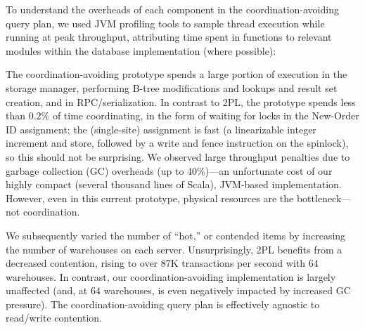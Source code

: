  To understand the overheads
of each component in the coordination-avoiding query plan, we used JVM
profiling tools to sample thread execution while running at peak
throughput, attributing time spent in functions to relevant modules
within the database implementation (where possible):

\begin{center}
\centering
\small
\setlength{\fboxsep}{4pt}
\end{center}

The coordination-avoiding prototype spends a large portion of
execution in the storage manager, performing B-tree modifications and
lookups and result set creation, and in RPC/serialization. In contrast
to 2PL, the prototype spends less than $0.2\%$ of time coordinating,
in the form of waiting for locks in the New-Order ID assignment; the
(single-site) assignment is fast (a linearizable integer increment and
store, followed by a write and fence instruction on the spinlock), so
this should not be surprising. We observed large throughput penalties
due to garbage collection (GC) overheads (up to 40\%)---an unfortunate
cost of our highly compact (several thousand lines of Scala),
JVM-based implementation. However, even in this current prototype,
physical resources are the bottleneck---not coordination.

 We subsequently varied the number of
``hot,'' or contended items by increasing the number of warehouses on
each server. Unsurprisingly, 2PL benefits from a decreased
contention, rising to over $87$K transactions per second with $64$
warehouses. In contrast, our coordination-avoiding implementation is
largely unaffected (and, at $64$ warehouses, is even negatively
impacted by increased GC pressure). The coordination-avoiding query
plan is effectively agnostic to read/write contention.

